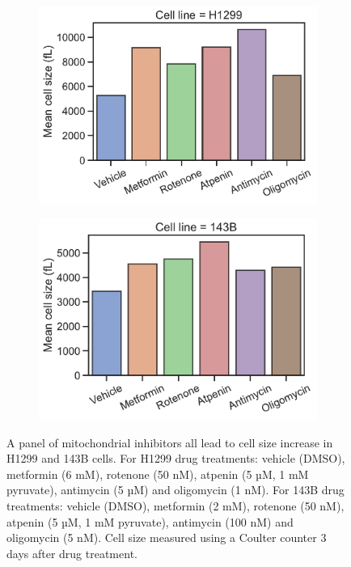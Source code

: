\begin{figure}
     \centering
     \begin{subfigure}[b]{0.4\textwidth}
         \includegraphics[width=\textwidth]{figures/chap6/ETCinhib_cell_size_H1299.pdf}
     \end{subfigure}
     \begin{subfigure}[b]{0.4\textwidth}
         \includegraphics[width=\textwidth]{figures/chap6/ETCinhib_cell_size_143B.pdf}
     \end{subfigure}
        \caption[Mitochondrial inhibitors increase cell size.]{
        A panel of mitochondrial inhibitors all lead to cell size increase in H1299 and 143B cells.
        For H1299 drug treatments: vehicle (DMSO), metformin (6 mM), rotenone (50 nM), atpenin (5 µM, 1 mM pyruvate), antimycin (5 µM) and oligomycin (1 nM).
        For 143B drug treatments: vehicle (DMSO), metformin (2 mM), rotenone (50 nM), atpenin (5 µM, 1 mM pyruvate), antimycin (100 nM) and oligomycin (5 nM).
        Cell size measured using a Coulter counter 3 days after drug treatment.
        }
        \label{fig:ch6:H1299_143B_ETCinhibi_cell_size}
\end{figure}

